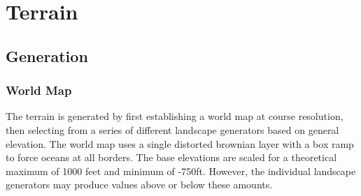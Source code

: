 
\chapter{Terrain}

\section{Generation}

\subsection{World Map}

The terrain is generated by first establishing a world map at course resolution, then selecting from a series of different landscape generators based on general elevation.
The world map uses a single distorted brownian layer with a box ramp to force oceans at all borders.
The base elevations are scaled for a theoretical maximum of 1000 feet and minimum of -750ft.
However, the individual landscape generators may produce values above or below these amounts.
